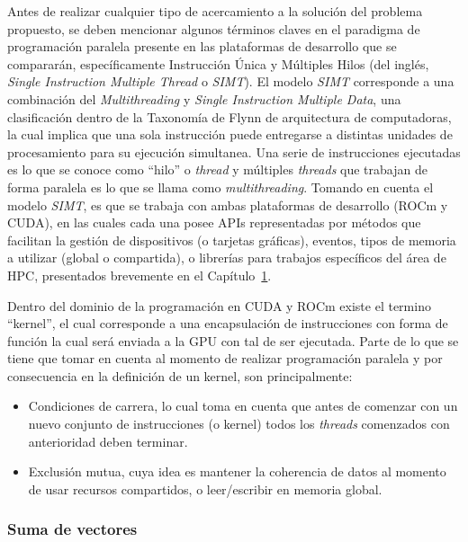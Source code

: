 Antes de realizar cualquier tipo de acercamiento a la solución del problema propuesto, se deben mencionar algunos términos claves en el paradigma de programación paralela presente en las plataformas de desarrollo que se compararán, específicamente Instrucción Única y Múltiples Hilos (del inglés, \textit{Single Instruction Multiple Thread} o \textit{SIMT}).
El modelo \textit{SIMT} corresponde a una combinación del \textit{Multithreading} y \textit{Single Instruction Multiple Data}, una clasificación dentro de la Taxonomía de Flynn \cite{simt} de arquitectura de computadoras, la cual implica que una sola instrucción puede entregarse a distintas unidades de procesamiento para su ejecución simultanea.
Una serie de instrucciones ejecutadas es lo que se conoce como ``hilo'' o \textit{thread} y múltiples \textit{threads} que trabajan de forma paralela es lo que se llama como \textit{multithreading}.
Tomando en cuenta el modelo \textit{SIMT}, es que se trabaja con ambas plataformas de desarrollo (ROCm y CUDA), en las cuales cada una posee APIs representadas por métodos que facilitan la gestión de dispositivos (o tarjetas gráficas), eventos, tipos de memoria a utilizar (global o compartida), o librerías para trabajos específicos del área de HPC, presentados brevemente en el Capítulo~\hyperref[sec:1]{1}.

Dentro del dominio de la programación en CUDA y ROCm existe el termino ``kernel'', el cual corresponde a una encapsulación de instrucciones con forma de función la cual será enviada a la GPU con tal de ser ejecutada.
Parte de lo que se tiene que tomar en cuenta al momento de realizar programación paralela y por consecuencia en la definición de un kernel, son principalmente:

\begin{itemize}
    \item Condiciones de carrera, lo cual toma en cuenta que antes de comenzar con un nuevo conjunto de instrucciones (o kernel) todos los \textit{threads} comenzados con anterioridad deben terminar.
    \item Exclusión mutua, cuya idea es mantener la coherencia de datos al momento de usar recursos compartidos, o leer/escribir en memoria global.
\end{itemize}

\subsubsection{Suma de vectores}

